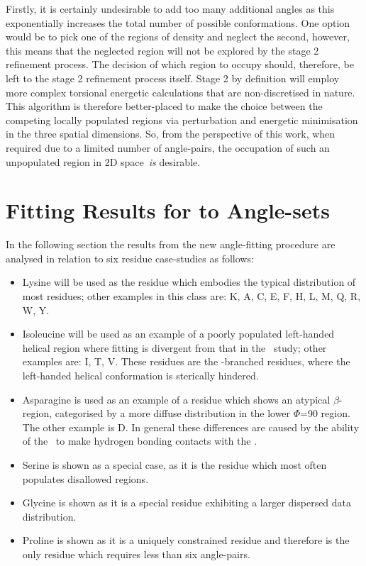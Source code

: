 Firstly, it is certainly undesirable to add too many additional angles as this exponentially increases the total number of possible conformations.  One option would be to pick one of the regions of density and neglect the second, however, this means that the neglected region will not be explored by the stage 2 refinement process. The decision of which region to occupy should, therefore, be left to the stage 2 refinement process itself.
Stage 2 by definition will employ more complex torsional energetic calculations that are non-discretised in nature. This algorithm is therefore better-placed to make the choice between the competing locally populated regions via perturbation and energetic minimisation in the three spatial dimensions.
So, from the perspective of this work, when required due to a limited number of angle-pairs, the occupation of such an unpopulated region in 2D space\ \emph{is} desirable.


\section{Fitting Results for  to  Angle-sets}

In the following section the results from the new angle-fitting procedure are analysed in relation to six residue case-studies as follows:

\begin{itemize} \isep
\item Lysine will be used as the residue which embodies the typical distribution of most residues; other examples in this class are: K, A, C, E, F, H, L, M, Q, R, W, Y.
\item   Isoleucine will be used as an example of a poorly populated left-handed helical region where fitting is divergent from that in the \raft\ study; other examples are: I, T, V.
These residues are the \be-branched residues, where the left-handed helical conformation is sterically hindered.\item    Asparagine is used as an example of a residue which shows an atypical $\beta$-region, categorised by a more diffuse distribution in the lower $\Phi$=90 region.
The other example is D. In general these differences are caused by the ability of the \sidechain\ to make hydrogen bonding contacts with the \mainchain.
\item   Serine is shown as a special case, as it is the residue which most often populates disallowed regions.
\item   Glycine is shown as it is a special residue exhibiting a larger dispersed data distribution.\item Proline  is shown as it is a uniquely constrained residue and therefore is the only residue which requires less than six angle-pairs.
\end{itemize}

